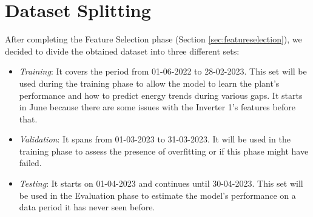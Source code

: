 \section{Dataset Splitting}\label{sec:datasetsplitting}
After completing the Feature Selection phase (Section
\ref{sec:featureselection}), we decided to divide the obtained
dataset into three different sets:


\begin{itemize}
	\item \textit{Training}: It covers the period from 01-06-2022 to
	      28-02-2023. This set will be used during the training phase
	      to allow the model to learn the plant's performance and how
	      to predict energy trends during various gaps.
	      It starts in June because there are some issues with the
	      Inverter 1's features before that.

	\item \textit{Validation}: It spans from 01-03-2023 to 31-03-2023.
	      It will be used in the training phase to assess the presence
	      of overfitting or if this phase might have failed.

	\item \textit{Testing}: It starts on 01-04-2023 and continues
	      until 30-04-2023. This set will be used in the Evaluation phase
	      to estimate the model's performance on a data period it has
	      never seen before.

\end{itemize}

